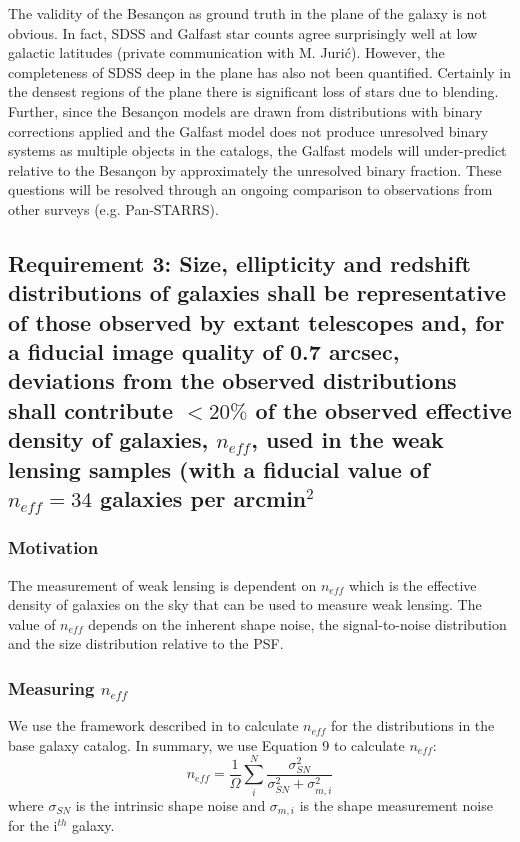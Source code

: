 \documentclass[]{article}
\begin{document}
{The validity of the Besan\c{c}on as ground truth in the plane of the galaxy is not obvious.  In fact, SDSS and Galfast star counts agree surprisingly well at low galactic latitudes (private communication with M. Juri\'{c}). 
However, the completeness of SDSS deep in the plane has also not been quantified.  Certainly in the densest regions
of the plane there is significant loss of stars due to blending.  Further, since the Besan\c{c}on models are drawn
from distributions with binary corrections applied and the Galfast model does not produce unresolved binary systems
as multiple objects in the catalogs, the Galfast models will under-predict relative to the Besan\c{c}on by 
approximately the unresolved binary fraction.  These questions will be resolved through an ongoing comparison to observations
from other surveys (e.g. Pan-STARRS).

\subsection{Requirement 3: Size, ellipticity and redshift distributions of galaxies shall be representative of those observed by extant
telescopes and, for a fiducial image quality of 0.7 arcsec, deviations from the observed distributions shall
contribute $< 20\%$ of the observed effective density of galaxies, $n_{eff}$, used in the weak lensing samples (with a fiducial value of
$n_{eff} = 34$ galaxies per arcmin$^2$}
\subsubsection{Motivation}
The measurement of weak lensing is dependent 
on $n_{eff}$ which is the effective density of galaxies on the sky that can be used to measure weak lensing.  
The value of $n_{eff}$ depends on the inherent shape noise, the signal-to-noise distribution and the size distribution relative to the PSF.



\subsubsection{Measuring $n_{eff}$}
We use the framework described in \citet{chang} to calculate $n_{eff}$ for the distributions in the 
base galaxy catalog.  In summary, we use Equation 9 to calculate $n_{eff}$:
\begin{equation}
n_{eff} = \frac{1}{\Omega}\sum^N_i\frac{\sigma^2_{SN}}{\sigma^2_{SN}+\sigma^2_{m,i}}
\end{equation}
where $\sigma_{SN}$ is the intrinsic shape noise and $\sigma_{m,i}$ is the shape measurement noise for the i$^{th}$ galaxy.

}
\end{document}
